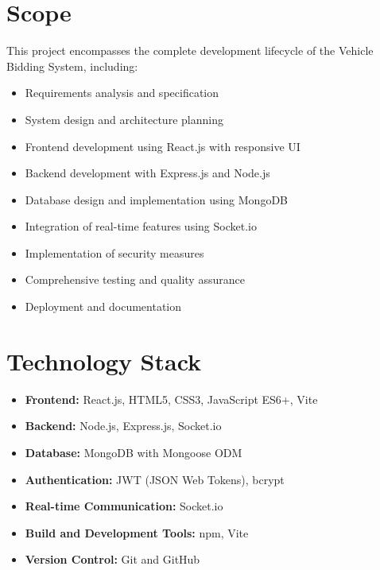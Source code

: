 \section{Scope}
This project encompasses the complete development lifecycle of the Vehicle Bidding System, including:
\begin{itemize}
    \item Requirements analysis and specification
    \item System design and architecture planning
    \item Frontend development using React.js with responsive UI
    \item Backend development with Express.js and Node.js
    \item Database design and implementation using MongoDB
    \item Integration of real-time features using Socket.io
    \item Implementation of security measures
    \item Comprehensive testing and quality assurance
    \item Deployment and documentation
\end{itemize}

\section{Technology Stack}
\begin{itemize}
    \item \textbf{Frontend:} React.js, HTML5, CSS3, JavaScript ES6+, Vite
    \item \textbf{Backend:} Node.js, Express.js, Socket.io
    \item \textbf{Database:} MongoDB with Mongoose ODM
    \item \textbf{Authentication:} JWT (JSON Web Tokens), bcrypt
    \item \textbf{Real-time Communication:} Socket.io
    \item \textbf{Build and Development Tools:} npm, Vite
    \item \textbf{Version Control:} Git and GitHub
\end{itemize}

